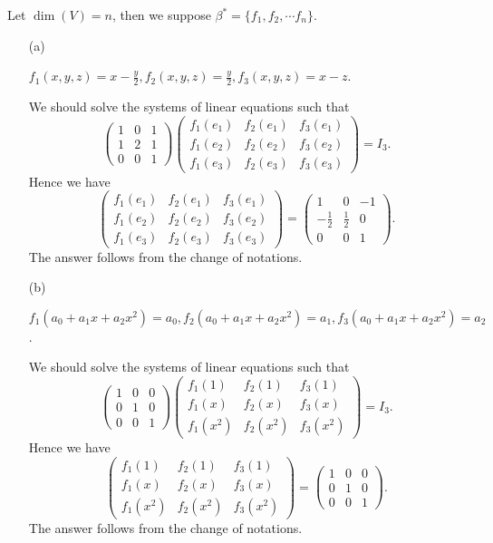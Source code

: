 \begin{Exercise}
Let $\dim(V) = n$, then we suppose $\beta^* = \{f_1,f_2,\cdots f_n\}$.
\begin{enumerate}[(a)]
\item[(a)]
\begin{answer}
$f_1(x,y,z) = x-\frac{y}{2},f_2(x,y,z) = \frac{y}{2},f_3(x,y,z) = x-z$.
\end{answer}
\begin{solution}
We should solve the systems of linear equations such that
$$
\begin{pmatrix}
1 & 0 & 1 \\
1 & 2 & 1 \\
0 & 0 & 1
\end{pmatrix} \begin{pmatrix}
f_1(e_1) & f_2(e_1) & f_3(e_1) \\
f_1(e_2) & f_2(e_2) & f_3(e_2) \\
f_1(e_3) & f_2(e_3) & f_3(e_3)
\end{pmatrix} = I_3.
$$
Hence we have
$$
\begin{pmatrix}
f_1(e_1) & f_2(e_1) & f_3(e_1) \\
f_1(e_2) & f_2(e_2) & f_3(e_2) \\
f_1(e_3) & f_2(e_3) & f_3(e_3)
\end{pmatrix} = \begin{pmatrix}
1 & 0 & -1 \\
-\frac{1}{2} & \frac{1}{2} & 0 \\
0 & 0 & 1
\end{pmatrix}.
$$
The answer follows from the change of notations.
\end{solution}

\item[(b)]
\begin{answer}
$f_1(a_0+a_1 x+a_2 x^2) = a_0,f_2(a_0+a_1 x+a_2 x^2) = a_1,f_3(a_0+a_1 x+a_2 x^2) = a_2$.
\end{answer}
\begin{solution}
We should solve the systems of linear equations such that
$$
\begin{pmatrix}
1 & 0 & 0 \\
0 & 1 & 0 \\
0 & 0 & 1
\end{pmatrix} \begin{pmatrix}
f_1(1) & f_2(1) & f_3(1) \\
f_1(x) & f_2(x) & f_3(x) \\
f_1(x^2) & f_2(x^2) & f_3(x^2)
\end{pmatrix} = I_3.
$$
Hence we have
$$
\begin{pmatrix}
f_1(1) & f_2(1) & f_3(1) \\
f_1(x) & f_2(x) & f_3(x) \\
f_1(x^2) & f_2(x^2) & f_3(x^2)
\end{pmatrix} = \begin{pmatrix}
1 & 0 & 0 \\
0 & 1 & 0 \\
0 & 0 & 1
\end{pmatrix}.
$$
The answer follows from the change of notations.
\end{solution}

\end{enumerate}
\end{Exercise}